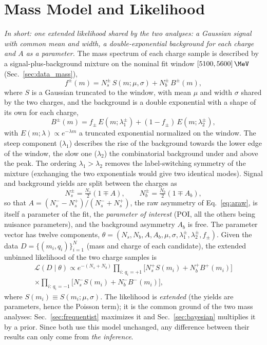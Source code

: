 \section{Mass Model and Likelihood}
\label{sec:model}
\label{sec:bayes_model}
\emph{In short: one extended likelihood shared by the two analyses: a Gaussian signal with common mean and width, a double-exponential background for each charge and $A$ as a parameter.}
The mass spectrum of each charge sample is described by a signal-plus-background mixture on the nominal fit window $[5100,5600]\,\MeV$ (Sec.~\ref{sec:data_mass}),
\begin{equation}
f^{\pm}(m)=N_s^{\pm}\,S(m;\mu,\sigma)+N_b^{\pm}\,B^{\pm}(m),
\label{eq:mixture}
\end{equation}
where $S$ is a Gaussian truncated to the window, with mean $\mu$ and width $\sigma$ shared by the two charges, and the background is a double exponential with a shape of its own for each charge,
\[
B^{\pm}(m)=f_{\pm}\,E(m;\lambda_{1}^{\pm})+(1-f_{\pm})\,E(m;\lambda_{2}^{\pm}),
\]
with $E(m;\lambda)\propto e^{-\lambda m}$ a truncated exponential normalized on the window. The steep component ($\lambda_1$) describes the rise of the background towards the lower edge of the window, the slow one ($\lambda_2$) the combinatorial background under and above the peak. The ordering $\lambda_1>\lambda_2$ removes the label-switching symmetry of the mixture (exchanging the two exponentials would give two identical modes). Signal and background yields are split between the charges as
\[
N_s^{\pm}=\tfrac{N_s}{2}(1\mp A),\qquad N_b^{\pm}=\tfrac{N_b}{2}(1\mp A_b),
\]
so that $A=(N_s^--N_s^+)/(N_s^-+N_s^+)$, the raw asymmetry \Araw of Eq.~\eqref{eq:araw}, is itself a parameter of the fit, the \emph{parameter of interest} (POI, all the others being nuisance parameters), and the background asymmetry $A_b$ is free. The parameter vector has twelve components, $\theta=(N_s,N_b,A,A_b,\mu,\sigma,\lambda_1^{\pm},\lambda_2^{\pm},f_{\pm})$.
Given the data $D=\{(m_i,q_i)\}_{i=1}^{N}$ (mass and charge of each candidate), the extended unbinned likelihood of the two charge samples is
\begin{multline}
\mathcal{L}(D\mid\theta)\propto e^{-(N_s+N_b)}
\prod_{i:\,q_i=+1}\Big[N_s^{+}S(m_i)+N_b^{+}B^{+}(m_i)\Big] \\
\times\prod_{i:\,q_i=-1}\Big[N_s^{-}S(m_i)+N_b^{-}B^{-}(m_i)\Big],
\label{eq:likelihood}
\end{multline}
where $S(m_i)\equiv S(m_i;\mu,\sigma)$. The likelihood is \emph{extended} (the yields are parameters, hence the Poisson term); it is the common ground of the two mass analyses: Sec.~\ref{sec:frequentist} maximizes it and Sec.~\ref{sec:bayesian} multiplies it by a prior. Since both use this model unchanged, any difference between their results can only come from \emph{the inference}.
